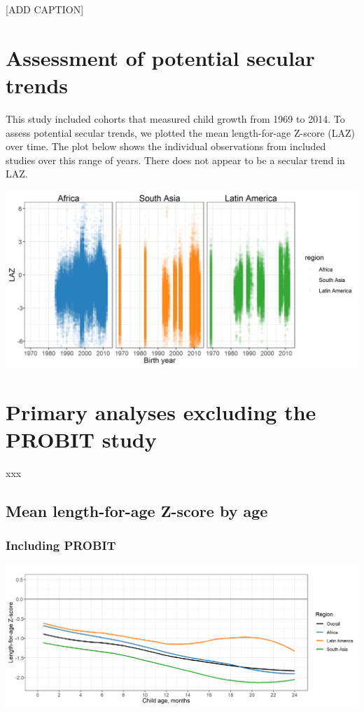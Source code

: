 \documentclass[9pt,]{book}
\begin{document}
{[}ADD CAPTION{]}

\hypertarget{secular-trends}{%
\chapter{Assessment of potential secular trends}\label{secular-trends}}

\raggedright

This study included cohorts that measured child growth from 1969 to 2014. To assess potential secular trends, we plotted the mean length-for-age Z-score (LAZ) over time. The plot below shows the individual observations from included studies over this range of years. There does not appear to be a secular trend in LAZ.

\includegraphics[width=33.33in]{figure-copies/laz_secular_trend}

\hypertarget{exclude-PROBIT}{%
\chapter{Primary analyses excluding the PROBIT study}\label{exclude-PROBIT}}

\raggedright

xxx

\hypertarget{mean-length-for-age-z-score-by-age}{%
\section{Mean length-for-age Z-score by age}\label{mean-length-for-age-z-score-by-age}}

\hypertarget{including-probit}{%
\subsection{Including PROBIT}\label{including-probit}}

\includegraphics[width=41.67in]{figure-copies/fig-laz-2-mean-overall_region--allage-primary}
\end{document}
